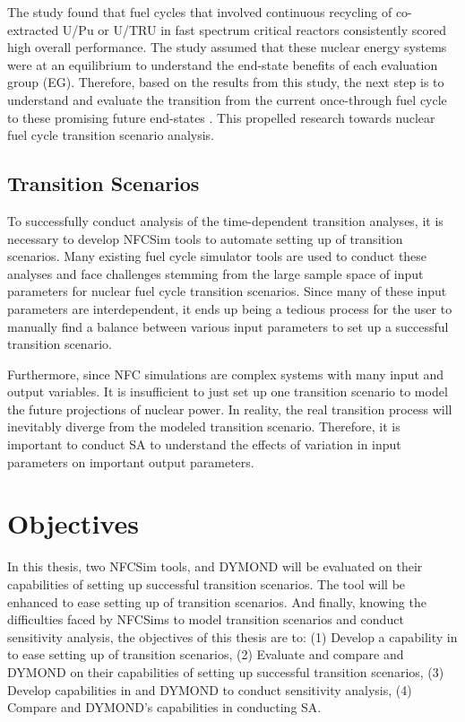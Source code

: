 The study found that fuel cycles that involved continuous recycling
of co-extracted U/Pu or U/TRU in fast spectrum critical reactors
consistently scored high overall performance. 
The study assumed that 
these nuclear energy systems were at an equilibrium to understand 
the end-state benefits of each evaluation group (EG). 
Therefore, based on the results from this study, the next step is 
to understand and evaluate the transition from the current 
once-through fuel cycle to these promising 
future end-states \cite{feng_standardized_2016}. 
This propelled research towards nuclear fuel cycle transition 
scenario analysis. 

\subsection{Transition Scenarios}
To successfully conduct analysis of the time-dependent transition
analyses, it is necessary to develop \gls{NFCSim} tools to  
automate setting up of transition scenarios. 
Many existing fuel cycle simulator tools are used to conduct 
these analyses and face challenges stemming from the large sample 
space of input 
parameters for nuclear fuel cycle transition scenarios.
Since many of these input parameters are interdependent, it ends
up being a tedious process for the user to manually find a balance 
between various input parameters to set up a successful transition 
scenario. 

Furthermore, since \gls{NFC} simulations are complex systems with 
many input and output variables. 
It is insufficient to just set up one transition scenario to model 
the future projections of nuclear power. 
In reality, the real transition process will 
inevitably diverge from the modeled transition scenario. 
Therefore, it is important to conduct \gls{SA} to understand 
the effects of variation in input parameters on 
important output parameters. 

\section{Objectives}
In this thesis, two \gls{NFCSim} tools, \Cyclus and 
DYMOND will be evaluated on their capabilities of setting up 
successful transition scenarios. 
The \Cyclus tool will be enhanced to ease setting up of 
transition scenarios. 
And finally,   
knowing the difficulties faced by \glspl{NFCSim} to model 
transition scenarios and conduct sensitivity analysis, 
the objectives of this thesis are to: 
(1) Develop a capability in \Cyclus to ease setting up of transition 
scenarios, 
(2) Evaluate and compare \Cyclus and 
DYMOND on their capabilities of setting up 
successful transition scenarios,
(3) Develop capabilities in \Cyclus and DYMOND to conduct 
sensitivity analysis,
(4) Compare \Cyclus and DYMOND's capabilities in conducting \gls{SA}. 
